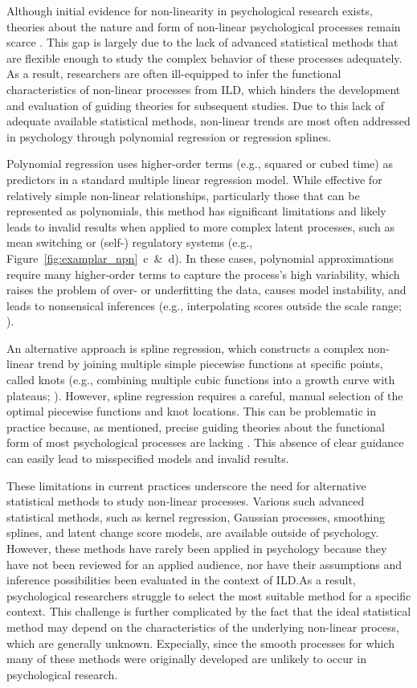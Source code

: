 \documentclass[man, floatsintext]{apa7}
\begin{document}
Although initial evidence for non-linearity in psychological research exists,
theories about the nature and form of non-linear psychological processes remain
scarce \parencite{tan_time-varying_2011}. This gap is largely due to the lack
of advanced statistical methods that are flexible enough to study the complex
behavior of these processes adequately. As a result, researchers are often
ill-equipped to infer the functional characteristics of non-linear processes
from ILD, which hinders the development and evaluation of guiding theories for
subsequent studies. Due to this lack of adequate available statistical methods,
non-linear trends are most often addressed in psychology through polynomial
regression or regression splines.

Polynomial regression \parencite{jebb_time_2015} uses higher-order terms
(e.g., squared or cubed time) as predictors in a standard multiple linear
regression model. While effective for relatively simple non-linear
relationships,
particularly those that can be represented as polynomials, this method has
significant limitations and likely leads to invalid results when applied to
more complex latent processes, such as mean switching or (self-) regulatory
systems (e.g., Figure~\ref{fig:examplar_npn}~c~\&~d). In these cases,
polynomial approximations require many higher-order
terms to capture the process's high variability, which raises the problem of
over- or underfitting the data, causes model instability, and leads to
nonsensical inferences (e.g., interpolating scores outside the scale range;
\textcite{boyd_divergence_2009,harrell_general_2001}).

An alternative approach is spline regression, which constructs a complex
non-linear trend by joining multiple simple piecewise functions at specific
points, called knots (e.g., combining multiple cubic functions into a growth
curve with plateaus; \textcite{tsay_nonlinear_2019}). However, spline
regression requires a careful, manual selection of the optimal piecewise
functions and
knot locations. This can be problematic in practice because, as mentioned,
precise guiding theories about the functional form of most psychological
processes are lacking \parencite{tan_time-varying_2011}. This absence of clear
guidance can easily lead to misspecified models and invalid results.

These limitations in current practices underscore the need for alternative
statistical methods to study non-linear processes. Various
such advanced statistical
methods, such as kernel regression, Gaussian processes, smoothing splines, and
latent change score models, are available outside of psychology. However, these
methods have rarely been applied in psychology because they have not been
reviewed for an applied audience, nor have their assumptions and inference
possibilities been evaluated in the context of ILD.\@ As a result,
psychological researchers struggle to select the most suitable method for a
specific context. This challenge is further complicated by the fact that the
ideal statistical method may depend on the characteristics of the underlying
non-linear process, which are generally unknown. Expecially, since the smooth
processes for which many of these methods were originally developed are
unlikely to occur in psychological research.
\end{document}
